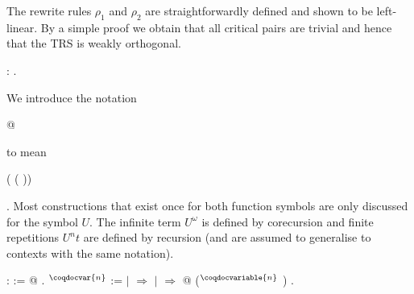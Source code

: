 The rewrite rules $\rho_1$ and $\rho_2$ are straightforwardly defined
and shown to be left-linear. By a simple proof we obtain that all
critical pairs are trivial and hence that the TRS is weakly
orthogonal.
\begin{singlespace}
\begin{coqdoccode}
\coqdocnoindent
{}
 :
{}.\coqdoceol
\end{coqdoccode}
\end{singlespace}
We introduce the notation \begin{coqdoccode} @
  \end{coqdoccode} to mean
\begin{coqdoccode}
   ( 
  (
  ))\end{coqdoccode}. Most
constructions that exist once for both function symbols are only
discussed for the symbol $U$. The infinite term $U^\omega$ is defined
by corecursion and finite repetitions $U^n t$ are defined by recursion
(and are assumed to generalise to contexts with the same notation).
\begin{singlespace}
\begin{coqdoccode}
\coqdocnoindent
{}
:  :=
 @
.\coqdoceol
\coqdocemptyline
\coqdocnoindent
{}
$^\coqdocvar{n}$
 :=\coqdoceol
\coqdocindent{1.00em}
  \coqdoceol
\coqdocindent{1.00em}
\ensuremath{|}
\ensuremath{\Rightarrow} \coqdoceol
\coqdocindent{1.00em}
\ensuremath{|}
 \ensuremath{\Rightarrow}
 @
($^\coqdocvariable{n}$
)\coqdoceol
\coqdocindent{1.00em}
.\coqdoceol
\end{coqdoccode}
\end{singlespace}
